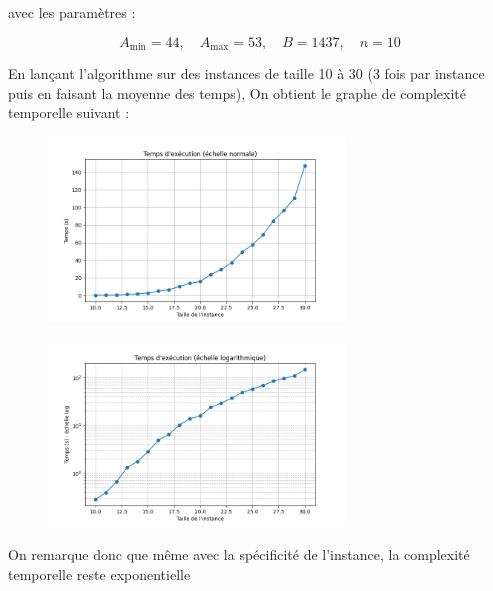\documentclass[a4paper,11pt]{article}
\begin{document}
avec les paramètres :

\[
A_{\min} = 44, \quad
A_{\max} = 53, \quad
B = 1437, \quad
n = 10
\]

En lançant l'algorithme sur des instances de taille 10 à 30 (3 fois par instance puis en faisant la moyenne des temps), 
On obtient le graphe de complexité temporelle suivant :

\begin{figure}[H]
  \centering
  \includegraphics[width=0.7\textwidth]{figs/temps_execution_lineaire.png}
\end{figure}
\begin{figure}[H]
  \centering
  \includegraphics[width=0.7\textwidth]{figs/temps_execution_log.png}
\end{figure}

On remarque donc que même avec la spécificité de l'instance, 
la complexité temporelle reste exponentielle
\end{document}
